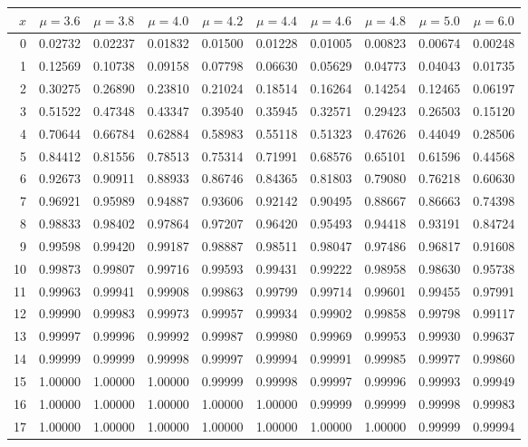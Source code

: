 \myskip
\begin{tabular}{r|*{9}{c}}
$x$ &  $\mu=3.6$  &  $\mu=3.8$  &  $\mu=4.0$  &  $\mu=4.2$  &  $\mu=4.4$
    &  $\mu=4.6$  &  $\mu=4.8$  &  $\mu=5.0$  &  $\mu=6.0$                    \\\hline
  0 & 0.02732 & 0.02237 & 0.01832 & 0.01500 & 0.01228 & 0.01005 & 0.00823 & 0.00674 & 0.00248 \\
  1 & 0.12569 & 0.10738 & 0.09158 & 0.07798 & 0.06630 & 0.05629 & 0.04773 & 0.04043 & 0.01735 \\
  2 & 0.30275 & 0.26890 & 0.23810 & 0.21024 & 0.18514 & 0.16264 & 0.14254 & 0.12465 & 0.06197 \\
  3 & 0.51522 & 0.47348 & 0.43347 & 0.39540 & 0.35945 & 0.32571 & 0.29423 & 0.26503 & 0.15120 \\
  4 & 0.70644 & 0.66784 & 0.62884 & 0.58983 & 0.55118 & 0.51323 & 0.47626 & 0.44049 & 0.28506 \\
  5 & 0.84412 & 0.81556 & 0.78513 & 0.75314 & 0.71991 & 0.68576 & 0.65101 & 0.61596 & 0.44568 \\
  6 & 0.92673 & 0.90911 & 0.88933 & 0.86746 & 0.84365 & 0.81803 & 0.79080 & 0.76218 & 0.60630 \\
  7 & 0.96921 & 0.95989 & 0.94887 & 0.93606 & 0.92142 & 0.90495 & 0.88667 & 0.86663 & 0.74398 \\
  8 & 0.98833 & 0.98402 & 0.97864 & 0.97207 & 0.96420 & 0.95493 & 0.94418 & 0.93191 & 0.84724 \\
  9 & 0.99598 & 0.99420 & 0.99187 & 0.98887 & 0.98511 & 0.98047 & 0.97486 & 0.96817 & 0.91608 \\
 10 & 0.99873 & 0.99807 & 0.99716 & 0.99593 & 0.99431 & 0.99222 & 0.98958 & 0.98630 & 0.95738 \\
 11 & 0.99963 & 0.99941 & 0.99908 & 0.99863 & 0.99799 & 0.99714 & 0.99601 & 0.99455 & 0.97991 \\
 12 & 0.99990 & 0.99983 & 0.99973 & 0.99957 & 0.99934 & 0.99902 & 0.99858 & 0.99798 & 0.99117 \\
 13 & 0.99997 & 0.99996 & 0.99992 & 0.99987 & 0.99980 & 0.99969 & 0.99953 & 0.99930 & 0.99637 \\
 14 & 0.99999 & 0.99999 & 0.99998 & 0.99997 & 0.99994 & 0.99991 & 0.99985 & 0.99977 & 0.99860 \\
 15 & 1.00000 & 1.00000 & 1.00000 & 0.99999 & 0.99998 & 0.99997 & 0.99996 & 0.99993 & 0.99949 \\
 16 & 1.00000 & 1.00000 & 1.00000 & 1.00000 & 1.00000 & 0.99999 & 0.99999 & 0.99998 & 0.99983 \\
 17 & 1.00000 & 1.00000 & 1.00000 & 1.00000 & 1.00000 & 1.00000 & 1.00000 & 0.99999 & 0.99994 \\
\end{tabular}

